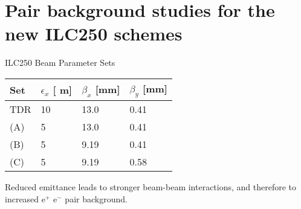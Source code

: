 \documentclass[xcolor={dvipsnames}]{beamer}
\newcommand{\electron}{e$^-$\xspace}
\newcommand{\positron}{e$^+$\xspace}
\newcommand{\murm}{%
  \ifmmode
    \mathchoice
        {\hbox{\normalsize\textmu}}
        {\hbox{\normalsize\textmu}}
        {\hbox{\scriptsize\textmu}}
        {\hbox{\tiny\textmu}}%
  \else
    \textmu
  \fi
}
\begin{document}
\section{Pair background studies for the new ILC250 schemes}

\begin{frame}{ILC250 Beam Parameter Sets}
 \begin{table}
\label{tab:Parameters}
\centering
\begin{tabularx}{0.55\textwidth}{llll}
\hline\hline
\textbf{Set}  & \textbf{$\epsilon_x$ [\murm m]} & \textbf{$\beta_x$ [mm]} & \textbf{$\beta_y$ [mm]}\\
\hline
\cline{1-4}
\hline
 TDR & 10 & 13.0 & 0.41\\
 (A) & 5 & 13.0 & 0.41\\
 (B) & 5 & 9.19 & 0.41\\
 (C) & 5 & 9.19 & 0.58\\
\hline\hline
\end{tabularx}
\end{table}
\alert{Reduced emittance leads to stronger beam-beam interactions, and therefore to increased \positron \electron pair background.}
\end{frame}
\end{document}
